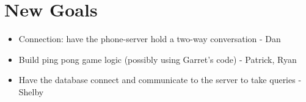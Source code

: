 \documentclass[11pt]{article} %
\begin{document}
\section{New Goals}

\begin{itemize}
        \item Connection: have the phone-server hold a two-way conversation - Dan
       \item Build ping pong game logic (possibly using Garret's code) - Patrick, Ryan
       \item Have the database connect and communicate to the server to take queries - Shelby
\end{itemize}
\end{document}
